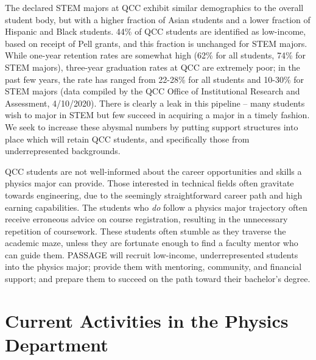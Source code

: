 \documentclass[12pt]{article}
\begin{document}
The declared STEM majors at QCC exhibit similar demographics to the overall student body, but with a higher fraction of Asian students and a lower fraction of Hispanic and Black students.  44\% of QCC students are identified as low-income, based on receipt of Pell grants, and this fraction is unchanged for STEM majors.  While one-year retention rates are somewhat high (62\% for all students, 74\% for STEM majors), three-year graduation rates at QCC are extremely poor; in the past few years, the rate has ranged from 22-28\% for all students and 10-30\% for STEM majors (data compiled by the QCC Office of Institutional Research and Assessment, 4/10/2020).  There is clearly a leak in this pipeline -- many students wish to major in STEM but few succeed in acquiring a major in a timely fashion.  We seek to increase these abysmal numbers by putting support structures into place which will retain QCC students, and specifically those from underrepresented backgrounds.



QCC students are not well-informed about the career opportunities and skills a physics major can provide.  
Those interested in technical fields often gravitate towards engineering, due to the seemingly straightforward career path and high earning capabilities.  The students who {\em do} follow a physics major trajectory often receive erroneous advice on course registration, resulting in the unnecessary repetition of coursework.  These students often stumble as they traverse the academic maze, unless they are fortunate enough to find a faculty mentor who can guide them.  PASSAGE will recruit low-income, underrepresented students into the physics major; provide them with mentoring, community, and financial support; and prepare them to succeed on the path toward their bachelor's degree.




\section{Current Activities in the Physics Department}
\end{document}
